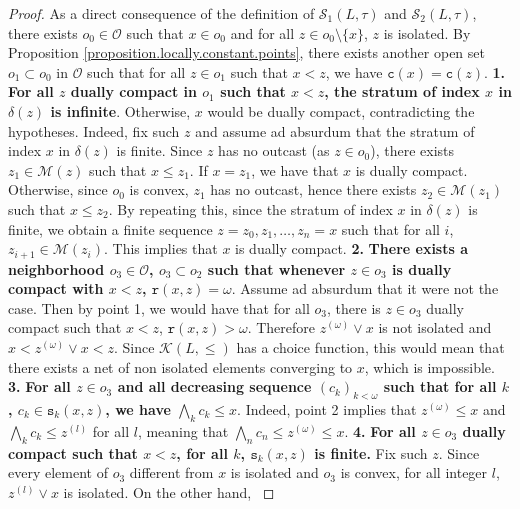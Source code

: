 \documentclass{article}
\begin{document}
\begin{proof}
As a direct consequence of the definition of $\mathcal{S}_1(L,\tau)$ and $\mathcal{S}_2(L,\tau)$, there exists $o_0 \in \mathcal{O}$ such that $x \in o_0$ and for all $z \in o_0 \setminus \{x\}$, $z$ is isolated. By Proposition \ref{proposition.locally.constant.points}, there exists another open set $o_1 \subset o_0$ in $\mathcal{O}$ such that for all $z \in o_1$ such that $x < z$, we have $\texttt{c}(x) = \texttt{c}(z)$.
\textbf{1.} \textbf{For all $z$ dually compact in $o_1$ such that $x < z$, the stratum of index $x$ in $\delta(z)$ is infinite}.
Otherwise, $x$ would be dually compact, contradicting the hypotheses. 
Indeed, fix such $z$ and assume ad absurdum that the stratum of index $x$ in $\delta(z)$ is finite. Since $z$ has no outcast (as $z \in o_0$), there exists $z_1 \in \mathcal{M}(z)$ such that $x \le z_1$. 
If $x = z_1$, we have that $x$ is dually compact. Otherwise, since $o_0$ is convex, $z_1$ has no outcast, hence there exists $z_2 \in \mathcal{M}(z_1)$ such that $x \le z_2$. By repeating this, since the stratum of index $x$ in $\delta(z)$ is finite, we obtain a finite sequence $z = z_0, z_1, \ldots , z_n = x$ such that for all $i$, $z_{i+1} \in \mathcal{M}(z_i)$. This implies that $x$ is dually compact.
\textbf{2.} \textbf{There exists a neighborhood $o_3 \in \mathcal{O}$, $o_3 \subset o_2$ such that whenever $z \in o_3$ is dually compact with $x < z$, $\texttt{r}(x,z) = \omega$}. Assume ad absurdum that it were not the case. Then by point 1, we would have that for all $o_3$, there is $z \in o_3$ dually compact such that $x < z$, $\texttt{r}(x,z) > \omega$. Therefore $z^{(\omega)} \vee x$ is not isolated and $x < z^{(\omega)} \vee x < z$. Since $\mathcal{K}(L,\le)$ has a choice function, this would mean that there exists a net of non isolated elements converging to $x$, which is impossible.
    \textbf{3.} \textbf{For all $z \in o_3$ and all decreasing sequence $(c_k)_{k < \omega}$ such that for all $k$,  
    $c_k \in \texttt{s}_{k}(x,z)$, 
    we have $\bigwedge_{k} c_{k} \le x$}. Indeed, point 2 implies that $z^{(\omega)} \le x$ and $\bigwedge_{k} c_{k} \le z^{(l)}$ for all $l$, meaning that $\bigwedge_{n} c_{n} \le z^{(\omega)} \le x$. 
    \textbf{4.} \textbf{For all $z \in o_3$ dually compact such that $x < z$, for all $k$, $\texttt{s}_k(x,z)$ is finite.} {Fix such $z$. Since every element of $o_3$ different from $x$ is isolated and $o_3$ is convex, for all integer $l$, $z^{(l)} \vee x$ is isolated. On the other hand, 
}
\end{proof}
\end{document}
